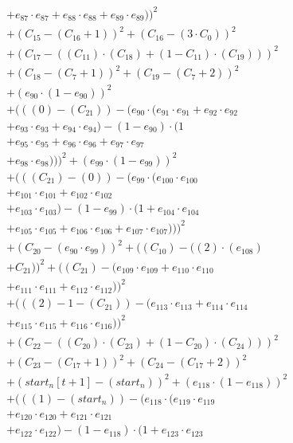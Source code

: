 \documentclass[10pt, a4paper]{article}
\begin{document}
\begin{align*}
& + e_{87} \cdot e_{87} + e_{88} \cdot e_{88} + e_{89} \cdot e_{89}))^{2} \\
& + (C_{15} - (C_{16} + 1))^{2} + (C_{16} - (3  \cdot  C_{0}))^{2} \\
& + (C_{17} - ((C_{11})  \cdot  (C_{18}) + (1 - C_{11})  \cdot  (C_{19})))^{2} \\
& + (C_{18} - (C_{7} + 1))^{2} + (C_{19} - (C_{7} + 2))^{2} \\
& + (e_{90} \cdot (1 - e_{90}))^{2} \\
& + (((0) - (C_{21})) - (e_{90} \cdot (e_{91} \cdot e_{91} + e_{92} \cdot e_{92} \\
& + e_{93} \cdot e_{93} + e_{94} \cdot e_{94}) - (1 - e_{90}) \cdot (1 \\
& + e_{95} \cdot e_{95} + e_{96} \cdot e_{96} + e_{97} \cdot e_{97} \\
& + e_{98} \cdot e_{98})))^{2} + (e_{99} \cdot (1 - e_{99}))^{2} \\
& + (((C_{21}) - (0)) - (e_{99} \cdot (e_{100} \cdot e_{100} \\
& + e_{101} \cdot e_{101} + e_{102} \cdot e_{102} \\
& + e_{103} \cdot e_{103}) - (1 - e_{99}) \cdot (1 + e_{104} \cdot e_{104} \\
& + e_{105} \cdot e_{105} + e_{106} \cdot e_{106} + e_{107} \cdot e_{107})))^{2} \\
& + (C_{20} - (e_{90} \cdot e_{99}))^{2} + ((C_{10}) - ((2)  \cdot  (e_{108}) \\
& + C_{21}))^{2} + ((C_{21}) - (e_{109} \cdot e_{109} + e_{110} \cdot e_{110} \\
& + e_{111} \cdot e_{111} + e_{112} \cdot e_{112}))^{2} \\
& + (((2) - 1 - (C_{21})) - (e_{113} \cdot e_{113} + e_{114} \cdot e_{114} \\
& + e_{115} \cdot e_{115} + e_{116} \cdot e_{116}))^{2} \\
& + (C_{22} - ((C_{20})  \cdot  (C_{23}) + (1 - C_{20})  \cdot  (C_{24})))^{2} \\
& + (C_{23} - (C_{17} + 1))^{2} + (C_{24} - (C_{17} + 2))^{2} \\
& + (start_n[t+1] - (start_n))^{2} + (e_{118} \cdot (1 - e_{118}))^{2} \\
& + (((1) - (start_n)) - (e_{118} \cdot (e_{119} \cdot e_{119} \\
& + e_{120} \cdot e_{120} + e_{121} \cdot e_{121} \\
& + e_{122} \cdot e_{122}) - (1 - e_{118}) \cdot (1 + e_{123} \cdot e_{123} \\

\end{align*}
\end{document}
